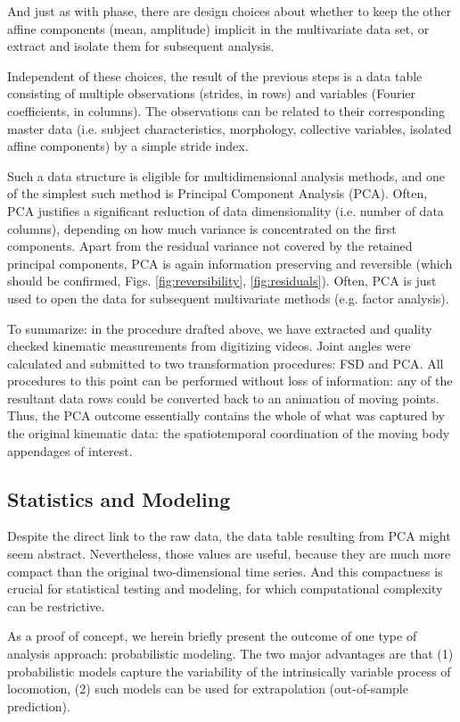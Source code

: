 And just as with phase, there are design choices about whether to keep the other affine components (mean, amplitude) implicit in the multivariate data set, or extract and isolate them for subsequent analysis.


Independent of these choices, the result of the previous steps is a data table consisting of multiple observations (strides, in rows) and variables (Fourier coefficients, in columns).
The observations can be related to their corresponding master data (i.e. subject characteristics, morphology, collective variables, isolated affine components) by a simple stride index.

Such a data structure is eligible for multidimensional analysis methods, and one of the simplest such method is Principal Component Analysis (PCA).
Often, PCA justifies a significant reduction of data dimensionality (i.e. number of data columns), depending on how much variance is concentrated on the first components.
Apart from the residual variance not covered by the retained principal components, PCA is again information preserving and reversible (which should be confirmed, Figs. \ref{fig:reversibility}, \ref{fig:residuals}).
Often, PCA is just used to open the data for subsequent multivariate methods (e.g. factor analysis).


To summarize: in the procedure drafted above, we have extracted and quality checked kinematic measurements from digitizing videos.
Joint angles were calculated and submitted to two transformation procedures: FSD and PCA.
All procedures to this point can be performed without loss of information: any of the resultant data rows could be converted back to an animation of moving points.
Thus, the PCA outcome essentially contains the whole of what was captured by the original kinematic data: the spatiotemporal coordination of the moving body appendages of interest.


\subsection{Statistics and Modeling}
\label{sec:org4c012ba}
Despite the direct link to the raw data, the data table resulting from PCA might seem abstract.
Nevertheless, those values are useful, because they are much more compact than the original two-dimensional time series.
And this compactness is crucial for statistical testing and modeling, for which computational complexity can be restrictive.


As a proof of concept, we herein briefly present the outcome of one type of analysis approach: probabilistic modeling.
The two major advantages are that (1) probabilistic models capture the variability of the intrinsically variable process of locomotion, (2) such models can be used for extrapolation (out-of-sample prediction).


